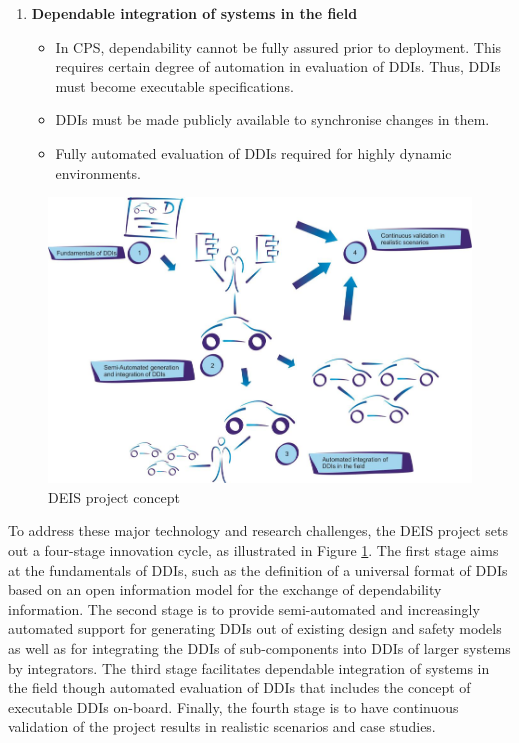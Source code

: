\begin{enumerate}
	\item \textbf{Dependable integration of systems in the field}
		\begin{itemize}
			\item In CPS, dependability cannot be fully assured prior to deployment. This requires certain degree of automation in evaluation of DDIs. Thus, DDIs must become executable specifications.
			\item DDIs must be made publicly available to synchronise changes in them.
			\item Fully automated evaluation of DDIs required for highly dynamic environments.
		\end{itemize}
\end{enumerate}

\begin{figure}[ht!]
	\centering
	\includegraphics[width=1\linewidth]{./fig/proj_concept.png}
	\caption{DEIS project concept}
	\label{fig:proj_concept}
\end{figure}

To address these major technology and research challenges, the DEIS project sets out a four-stage innovation cycle, as illustrated in Figure \ref{fig:proj_concept}. The first stage aims at the fundamentals of DDIs, such as the definition of a universal format of DDIs based on an open information model for the exchange of dependability information. The second stage is to provide semi-automated and increasingly automated support for generating DDIs out of existing design and safety models as well as for integrating the DDIs of sub-components into DDIs of larger systems by integrators. The third stage facilitates dependable integration of systems in the field though automated evaluation of DDIs that includes the concept of executable DDIs on-board. Finally, the fourth stage is to have continuous validation of the project results in realistic scenarios and case studies.



